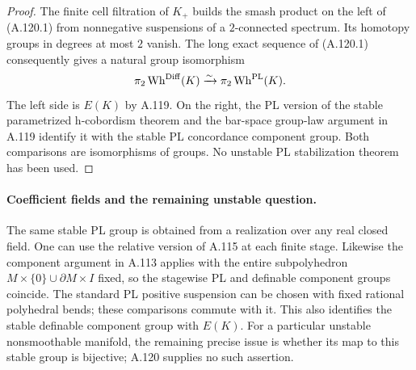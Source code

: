 \begin{proof}
The finite cell filtration of $K_+$ builds the smash product on the
left of (A.120.1) from nonnegative suspensions of a $2$-connected
spectrum. Its homotopy groups in degrees at most $2$ vanish.
The long exact sequence of (A.120.1) consequently gives a natural
group isomorphism
\[
 \pi_2\operatorname{Wh}^{\rm Diff}(K)
       \xrightarrow{\sim}\pi_2\operatorname{Wh}^{\rm PL}(K).
\]
The left side is $E(K)$ by A.119. On the right, the PL version of
the stable parametrized h-cobordism theorem and the bar-space
group-law argument in A.119 identify it with the stable PL
concordance component group. Both comparisons are isomorphisms of
groups. No unstable PL stabilization theorem has been used.
\end{proof}

\paragraph{Coefficient fields and the remaining unstable question.}
The same stable PL group is obtained from a realization over any
real closed field. One can use the relative version of A.115 at
each finite stage. Likewise the component argument in A.113
applies with the entire subpolyhedron
$M\times\{0\}\cup\partial M\times I$ fixed, so the stagewise PL
and definable component groups coincide. The standard PL positive
suspension can be chosen with fixed rational polyhedral bends;
these comparisons commute with it. This also identifies the
stable definable component group with $E(K)$. For a particular
unstable nonsmoothable manifold, the remaining precise issue is
whether its map to this stable group is bijective; A.120 supplies
no such assertion.

